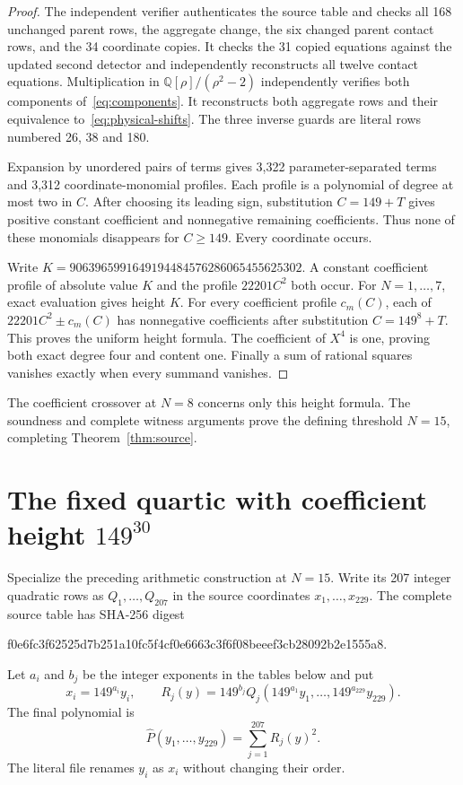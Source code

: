 \documentclass[11pt,a4paper]{article}
\newcommand{\Q}{\mathbb Q}\newcommand{\Z}{\mathbb Z}
\begin{document}
\begin{proof}
The independent verifier authenticates the source table and checks
all 168 unchanged parent rows, the aggregate change, the six
changed parent contact rows, and the 34 coordinate copies. It checks
the 31 copied equations against the updated second detector and
independently reconstructs all twelve contact equations. Multiplication in
$\Q[\rho]/(\rho^2-2)$ independently verifies both components
of~\eqref{eq:components}. It reconstructs both aggregate rows and
their equivalence to~\eqref{eq:physical-shifts}. The three inverse
guards are literal rows numbered 26, 38 and 180.

Expansion by unordered pairs of terms gives 3,322 parameter-separated
terms and 3,312 coordinate-monomial profiles. Each profile is a
polynomial of degree at most two in $C$. After choosing its leading
sign, substitution $C=149+T$ gives positive constant coefficient and
nonnegative remaining coefficients. Thus none of these monomials
disappears for $C\ge149$. Every coordinate occurs.

Write $K=9063965991649194484576286065455625302$. A constant coefficient
profile of absolute value $K$ and the profile $22201C^2$ both occur. For $N=1,\ldots,7$,
exact evaluation gives height $K$. For every coefficient profile
$c_m(C)$, each of $22201C^2\pm c_m(C)$ has nonnegative coefficients
after substitution $C=149^8+T$. This proves the uniform height
formula. The coefficient of $X^4$ is one, proving both exact degree
four and content one. Finally a sum of rational squares vanishes
exactly when every summand vanishes.
\end{proof}

The coefficient crossover at $N=8$ concerns only this height formula.
The soundness and complete witness arguments prove the defining
threshold $N=15$, completing Theorem~\ref{thm:source}.

\section{The fixed quartic with coefficient height \texorpdfstring{$149^{30}$}{149 to the power 30}}
\label{sec:compact-normalization}

Specialize the preceding arithmetic construction at $N=15$.
Write its 207 integer quadratic rows as $Q_1,\ldots,Q_{207}$ in
the source coordinates $x_1,\ldots,x_{229}$.
The complete source table has SHA-256 digest
\begin{center}\small\ttfamily
f0e6fc3f62525d7b251a10fc5f4cf0e6663c3f6f08beeef3cb28092b2e1555a8.
\end{center}
Let $a_i$ and $b_j$ be the integer exponents in the tables below and put
\begin{equation}\label{eq:compact-map}
 x_i=149^{a_i}y_i,\qquad
 R_j(y)=149^{b_j}Q_j(149^{a_1}y_1,\ldots,149^{a_{229}}y_{229}).
\end{equation}
The final polynomial is
\begin{equation}\label{eq:compact-polynomial}
 \widehat P(y_1,\ldots,y_{229})=\sum_{j=1}^{207}R_j(y)^2.
\end{equation}
The literal file renames $y_i$ as $x_i$ without changing their order.
\end{document}
